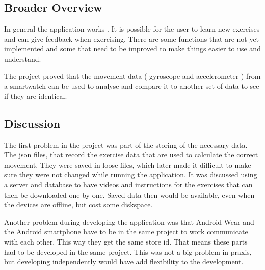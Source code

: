 \subsection{Broader Overview}
In general the application works . It is possible for the user  to learn new exercises and can give feedback when exercising. There are some functions that are not yet implemented and some that need to be improved to make things easier to use and understand.

The project proved that the movement data ( gyroscope and accelerometer ) from a smartwatch can be used to analyse and compare it to another set of data to see if they are identical.


\subsection{Discussion}
The first problem in the project was part of the storing of the necessary data. The json files, that record the exercise data that are used to calculate the correct movement. They were saved in loose files, which later made it difficult to make sure they were not changed while running the application. It was discussed using a server and database to have videos and instructions for the exercises that can then be downloaded one by one. Saved data then would be available, even when the devices are offline, but cost some diskspace.

Another problem during developing the application was that Android Wear and the Android smartphone have to be in the same project to work communicate with each other. This way they get the same store id. That means these parts had to be developed in the same project. This was not a big problem in praxis, but developing independently would have add flexibility to the development.

